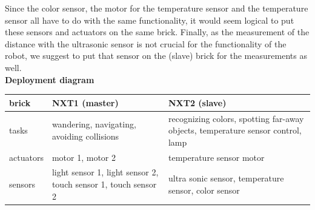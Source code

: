 \documentclass[11pt,a4paper]{article}
\begin{document}
Since the color sensor, the motor for the temperature sensor and the temperature sensor all have to do with the same functionality, it would seem logical to put these sensors and actuators on the same brick. Finally, as the measurement of the distance with the ultrasonic sensor is not crucial for the functionality of the robot, we suggest to put that sensor on the (slave) brick for the measurements as well.\\

\textbf{Deployment diagram}\\
\begin{tabular}{|p{3cm}|p{6cm}|p{6cm}|} 
\hline
\textbf{brick} & \textbf{NXT1 (master)} & \textbf{NXT2 (slave)}\\
\hline
tasks & wandering, navigating, avoiding collisions & recognizing colors, spotting far-away objects, temperature sensor control, lamp\\\hline
actuators & motor 1, motor 2 & temperature sensor motor\\\hline
sensors & light sensor 1, light sensor 2, touch sensor 1, touch sensor 2 & ultra sonic sensor, temperature sensor, color sensor\\
\hline
\end{tabular}
\end{document}
